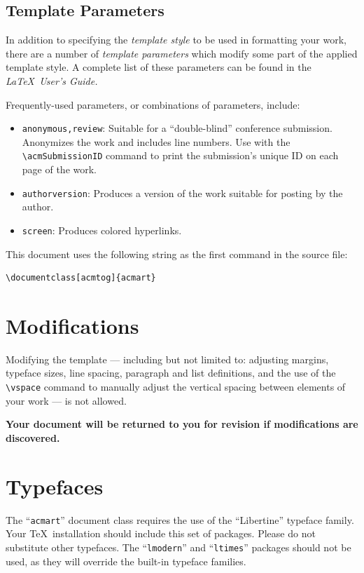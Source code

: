 \documentclass[acmtog]{acmart}
\begin{document}
\subsection{Template Parameters}

In addition to specifying the {\itshape template style} to be used in
formatting your work, there are a number of {\itshape template parameters}
which modify some part of the applied template style. A complete list
of these parameters can be found in the {\itshape \LaTeX\ User's Guide.}

Frequently-used parameters, or combinations of parameters, include:
\begin{itemize}
\item {\verb|anonymous,review|}: Suitable for a ``double-blind''
  conference submission. Anonymizes the work and includes line
  numbers. Use with the \verb|\acmSubmissionID| command to print the
  submission's unique ID on each page of the work.
\item{\verb|authorversion|}: Produces a version of the work suitable
  for posting by the author.
\item{\verb|screen|}: Produces colored hyperlinks.
\end{itemize}

This document uses the following string as the first command in the
source file:
\begin{verbatim}
\documentclass[acmtog]{acmart}
\end{verbatim}

\section{Modifications}

Modifying the template --- including but not limited to: adjusting
margins, typeface sizes, line spacing, paragraph and list definitions,
and the use of the \verb|\vspace| command to manually adjust the
vertical spacing between elements of your work --- is not allowed.

{\bfseries Your document will be returned to you for revision if
  modifications are discovered.}

\section{Typefaces}

The ``\verb|acmart|'' document class requires the use of the
``Libertine'' typeface family. Your \TeX\ installation should include
this set of packages. Please do not substitute other typefaces. The
``\verb|lmodern|'' and ``\verb|ltimes|'' packages should not be used,
as they will override the built-in typeface families.
\end{document}
